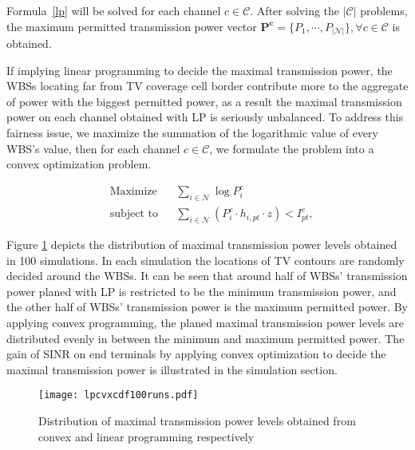 Formula~\ref{lp} will be solved for each channel $c\in \mathcal{C}$.
After solving the $|\mathcal{C}|$ problems, the maximum permitted transmission power vector $\bm{P^c} =\{P_1,\cdots,P_{|\mathcal{N}|}\}, \forall c\in \mathcal{C}$ is obtained.

If implying linear programming to decide the maximal transmission power, the WBSs locating far from TV coverage cell border
contribute more to the aggregate of power with the biggest permitted power, as a result the maximal transmission power on each channel obtained with LP is seriously unbalanced.
To address this fairness issue, we maximize the summation of the logarithmic value of every WBS's value, then for each channel $c\in \mathcal{C}$, we formulate the problem into a convex optimization problem.

	\begin{equation}
		\label{cvx}
		\begin{aligned}
		& {\text{Maximize}}
		& & \sum_{i\in \mathcal{N}} \log P^c_i \\
		& \text{subject to}
		& & \sum_{i\in \mathcal{N}} (P^c_i \cdot h_{i,pt}\cdot z) < I^c_{pt}, 
		\end{aligned}
	\end{equation}


Figure \ref{lpcvx} depicts the distribution of maximal transmission power levels obtained in 100 simulations. In each simulation the locations of TV contours are randomly decided around the WBSs. It can be seen that around half of WBSs' transmission power planed with LP is restricted to be the minimum transmission power, and the other half of WBSs' transmission power is the maximum permitted power. By applying convex programming, the planed maximal transmission power levels are distributed evenly in between the minimum and maximum permitted power. The gain of SINR on end terminals by applying convex optimization to decide the maximal transmission power is illustrated in the simulation section.

\begin{figure}[h!]
  \centering
  \texttt{[image: lpcvxcdf100runs.pdf]}
  \caption{Distribution of maximal transmission power levels obtained from convex and linear programming respectively}
\label{lpcvx}
\end{figure}



